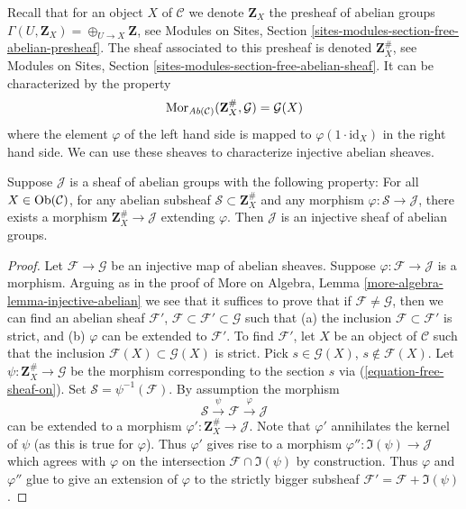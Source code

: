 \noindent
Recall that for an object $X$ of $\mathcal{C}$ we denote $\mathbf{Z}_X$
the presheaf of abelian groups $\Gamma(U, \mathbf{Z}_X) =
\oplus_{U \to X} \mathbf{Z}$, see
Modules on Sites, Section \ref{sites-modules-section-free-abelian-presheaf}.
The sheaf associated to this presheaf
is denoted $\mathbf{Z}_X^\#$, see
Modules on Sites, Section \ref{sites-modules-section-free-abelian-sheaf}.
It can be characterized by
the property
\begin{equation}
\label{equation-free-sheaf-on}
\mathop{\mathrm{Mor}}\nolimits_{\textit{Ab}(\mathcal{C})}(\mathbf{Z}_X^\#, \mathcal{G})
=
\mathcal{G}(X)
\end{equation}
where the element $\varphi$ of the left hand side is mapped
to $\varphi(1 \cdot \text{id}_X)$ in the right hand side. We can use these
sheaves to characterize injective abelian sheaves.

\begin{lemma}
\label{lemma-characterize-injectives}
Suppose $\mathcal{J}$ is a sheaf of abelian groups with the following
property: For all $X\in \mathop{\mathrm{Ob}}\nolimits(\mathcal{C})$, for any abelian subsheaf
$\mathcal{S} \subset \mathbf{Z}_X^\#$ and any morphism
$\varphi : \mathcal{S} \to \mathcal{J}$, there exists a morphism
$\mathbf{Z}_X^\# \to \mathcal{J}$ extending $\varphi$.
Then $\mathcal{J}$ is an injective sheaf of abelian groups.
\end{lemma}

\begin{proof}
Let $\mathcal{F} \to \mathcal{G}$ be an injective map
of abelian sheaves. Suppose $\varphi : \mathcal{F} \to \mathcal{J}$
is a morphism. Arguing as in the proof of
More on Algebra, Lemma \ref{more-algebra-lemma-injective-abelian}
we see that it suffices
to prove that if $\mathcal{F} \not = \mathcal{G}$, then we
can find an abelian sheaf $\mathcal{F}'$,
$\mathcal{F} \subset \mathcal{F}' \subset \mathcal{G}$
such that (a) the inclusion $\mathcal{F} \subset \mathcal{F}'$ is strict,
and (b) $\varphi$ can be extended to $\mathcal{F}'$.
To find $\mathcal{F}'$, let $X$ be an object of $\mathcal{C}$ such
that the inclusion $\mathcal{F}(X) \subset \mathcal{G}(X)$
is strict. Pick $s \in \mathcal{G}(X)$, $s \not \in \mathcal{F}(X)$.
Let $\psi : \mathbf{Z}_X^\# \to \mathcal{G}$ be the morphism corresponding
to the section $s$ via (\ref{equation-free-sheaf-on}). Set
$\mathcal{S} = \psi^{-1}(\mathcal{F})$. By assumption the morphism
$$
\mathcal{S} \xrightarrow{\psi} \mathcal{F} \xrightarrow{\varphi} \mathcal{J}
$$
can be extended to a morphism $\varphi' : \mathbf{Z}_X^\# \to \mathcal{J}$.
Note that $\varphi'$ annihilates the kernel of $\psi$ (as this is true
for $\varphi$). Thus $\varphi'$ gives rise to a morphism
$\varphi'' : \Im(\psi) \to \mathcal{J}$
which agrees with $\varphi$ on the intersection
$\mathcal{F} \cap \Im(\psi)$ by construction.
Thus $\varphi$ and $\varphi''$ glue to give an extension
of $\varphi$ to the strictly bigger subsheaf
$\mathcal{F}' = \mathcal{F} + \Im(\psi)$.
\end{proof}

